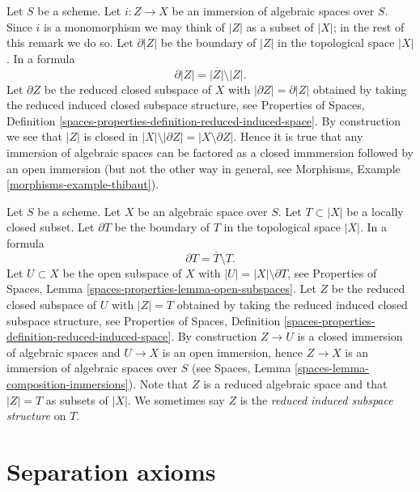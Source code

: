 \begin{remark}
\label{remark-immersion}
Let $S$ be a scheme. Let $i : Z \to X$ be an immersion of algebraic
spaces over $S$. Since $i$ is a monomorphism we may think of $|Z|$ as
a subset of $|X|$; in the rest of this remark we do so.
Let $\partial |Z|$ be the boundary of $|Z|$ in
the topological space $|X|$. In a formula
$$
\partial |Z| = \overline{|Z|} \setminus |Z|.
$$
Let $\partial Z$ be the reduced closed subspace of $X$ with
$|\partial Z| = \partial |Z|$
obtained by taking the reduced induced closed subspace structure, see
Properties of Spaces,
Definition \ref{spaces-properties-definition-reduced-induced-space}.
By construction we see that $|Z|$ is closed in
$|X| \setminus |\partial Z| = |X \setminus \partial Z|$.
Hence it is true that any immersion of algebraic spaces can be
factored as a closed immmersion followed by an open immersion
(but not the other way in general, see
Morphisms, Example \ref{morphisms-example-thibaut}).
\end{remark}

\begin{remark}
\label{remark-space-structure-locally-closed-subset}
Let $S$ be a scheme. Let $X$ be an algebraic space over $S$.
Let $T \subset |X|$ be a locally closed subset.
Let $\partial T$ be the boundary of $T$ in
the topological space $|X|$. In a formula
$$
\partial T = \overline{T} \setminus T.
$$
Let $U \subset X$ be the open subspace of $X$ with
$|U| = |X| \setminus \partial T$, see
Properties of Spaces, Lemma \ref{spaces-properties-lemma-open-subspaces}.
Let $Z$ be the reduced closed subspace of $U$ with
$|Z| = T$ obtained by taking the reduced induced
closed subspace structure, see
Properties of Spaces,
Definition \ref{spaces-properties-definition-reduced-induced-space}.
By construction $Z \to U$ is a closed immersion of algebraic spaces
and $U \to X$ is an open immersion, hence
$Z \to X$ is an immersion of algebraic spaces over $S$ (see
Spaces, Lemma \ref{spaces-lemma-composition-immersions}).
Note that $Z$ is a reduced algebraic space and that
$|Z| = T$ as subsets of $|X|$. We sometimes say
$Z$ is the {\it reduced induced subspace structure} on $T$.
\end{remark}









\section{Separation axioms}
\label{section-separation-axioms}

